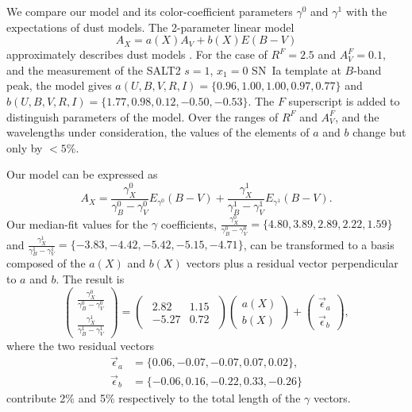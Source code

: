 \documentclass{aastex61}   	%
\begin{document}
We compare our model and its color-coefficient parameters $\gamma^0$ and $\gamma^1$ with the expectations of  dust models.
The 2-parameter linear model
\begin{equation}
A_X = a(X)  A_V + b(X) E(B-V)
\label{f99:eqn}
\end{equation}
approximately describes dust models \citep[e.g][]{1989ApJ...345..245C}.
For the case of
$R^F=2.5$ and $A^F_V=0.1$,
and the measurement of the SALT2
\citet{2007A&A...466...11G} $s=1$, $x_1=0$ SN~Ia template at $B$-band peak, the  model
gives
$a(U,B,V,R,I)=\{0.96,   1.00,   1.00,   0.97,   0.77\}$ and $b(U,B,V,R,I)=\{  1.77,   0.98,   0.12,  -0.50,  -0.53\}$.
The $F$ superscript is added to distinguish parameters of the  model.
Over the ranges of
 $R^F$ and $A^F_V$,
and the wavelengths under consideration,  the values of the elements of $a$ and $b$ change but only by $<5$\%.

Our model can be expressed as
\begin{equation}
A_X = \frac{\gamma^0_X}{\gamma^0_B-\gamma^0_V}  E_{\gamma^0}(B-V) +  \frac{\gamma^1_X}{\gamma^1_B-\gamma^1_V}  E_{\gamma^1}(B-V).
\end{equation}
Our median-fit values for the $\gamma$ coefficients,
$\frac{\gamma^0_X}{\gamma^0_B-\gamma^0_V}  =\{4.80 ,   3.89,   2.89,   2.22,   1.59\}$ and
$ \frac{\gamma^1_X}{\gamma^1_B-\gamma^1_V}=\{-3.83 ,  -4.42,  -5.42,  -5.15,  -4.71\}$,
can be transformed to a basis composed of the $a(X)$ and $b(X)$ vectors plus a residual vector perpendicular to $a$ and $b$.
The result is
\begin{equation}
\begin{pmatrix}
 \frac{\gamma^0_X}{\gamma^0_B-\gamma^0_V} \\
\frac{\gamma^1_X}{\gamma^1_B-\gamma^1_V} 
\end{pmatrix}=
\begin{pmatrix}
\begin{array}{rr}
2.82 & 1.15  \\
-5.27 & 0.72
\end{array}
\end{pmatrix} 
\begin{pmatrix}
a(X) \\
b(X)
\end{pmatrix}+
\begin{pmatrix}
\vec{\epsilon}_a \\
\vec{\epsilon}_b
\end{pmatrix},
\label{trans_I:eqn}
\end{equation}
where the two residual vectors
\begin{align}
\vec{\epsilon}_a &=\{0.06, -0.07, -0.07,  0.07, 0.02\}, \\
\vec{\epsilon}_b & =\{-0.06, 0.16, -0.22, 0.33, -0.26\}
\label{res_I:eqn}
\end{align}
contribute  2\% and 5\% respectively to the total  length of the $\gamma$ vectors.
\end{document}
